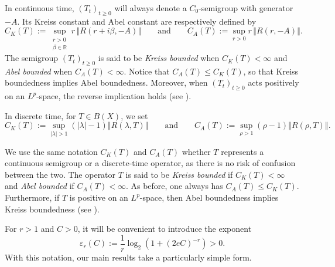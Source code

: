 \documentclass[12pt]{amsart}
\theoremstyle{plain}
\theoremstyle{remark}
\theoremstyle{definition}
\newcommand{\R}{\mathbb{R}}
\newcommand{\norm}[1]{\left\Vert #1\right\Vert}
\begin{document}
	In continuous time, $(T_t)_{t\ge 0}$ will always denote a $C_0$-semigroup with generator $-A$. Its Kreiss constant and Abel constant are respectively defined by
	\begin{equation*}\label{eqDefKreissContinuous}
		C_K(T)
		:=
		\sup_{\substack{r>0\\ \beta\in\R}}
		r\,\norm{R(r+i\beta,-A)}
		\qquad\text{and}\qquad
		C_A(T)
		:=
		\sup_{r>0}
		r\,\norm{R(r,-A)}.
	\end{equation*}
	The semigroup $(T_t)_{t\ge 0}$ is said to be \emph{Kreiss bounded} when $C_K(T)<\infty$ and \emph{Abel bounded} when $C_A(T)<\infty$. Notice that $C_A(T)\le C_K(T)$, so that Kreiss boundedness implies Abel boundedness. Moreover, when $(T_t)_{t\ge 0}$ acts positively on an $L^p$-space, the reverse implication holds (see \cite[Proposition 2.6]{ArnoldCoine2023}).
	
	In discrete time, for $T\in B(X)$, we set
	\begin{equation*}\label{eqDefKreissDiscrete}
		C_K(T)
		:=
		\sup_{|\lambda|>1}
		(|\lambda|-1)\norm{R(\lambda,T)}
		\qquad\text{and}\qquad
		C_A(T)
		:=
		\sup_{\rho>1}
		(\rho-1)\norm{R(\rho,T)}.
	\end{equation*}
	
	We use the same notation $C_K(T)$ and $C_A(T)$ whether $T$ represents a continuous semigroup or a discrete-time operator, as there is no risk of confusion between the two. The operator $T$ is said to be \emph{Kreiss bounded} if $C_K(T)<\infty$ and \emph{Abel bounded} if $C_A(T)<\infty$. As before, one always has $C_A(T)\le C_K(T)$. Furthermore, if $T$ is positive on an $L^p$-space, then Abel boundedness implies Kreiss boundedness (see \cite[Proposition 5.13]{CohenCunyEisnerLin2020}).
	
	For $r>1$ and $C>0$, it will be convenient to introduce the exponent
	\begin{equation*}\label{eq:def-eta}
		\varepsilon_r(C)
		:=
		\frac1r
		\log_2\!\left(
		1+(2eC)^{-r}
		\right)>0.
	\end{equation*}
	With this notation, our main results take a particularly simple form.
	
\end{document}
